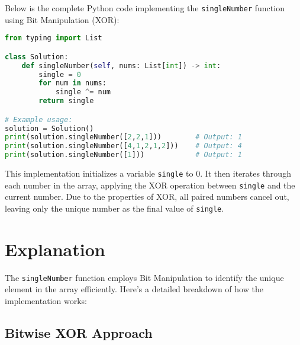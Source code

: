 
Below is the complete Python code implementing the \texttt{singleNumber} function using Bit Manipulation (XOR):

\begin{fullwidth}
\begin{lstlisting}[language=Python]
from typing import List

class Solution:
    def singleNumber(self, nums: List[int]) -> int:
        single = 0
        for num in nums:
            single ^= num
        return single

# Example usage:
solution = Solution()
print(solution.singleNumber([2,2,1]))        # Output: 1
print(solution.singleNumber([4,1,2,1,2]))    # Output: 4
print(solution.singleNumber([1]))            # Output: 1
\end{lstlisting}
\end{fullwidth}

This implementation initializes a variable \texttt{single} to 0. It then iterates through each number in the array, applying the XOR operation between \texttt{single} and the current number. Due to the properties of XOR, all paired numbers cancel out, leaving only the unique number as the final value of \texttt{single}.

\section*{Explanation}

The \texttt{singleNumber} function employs Bit Manipulation to identify the unique element in the array efficiently. Here's a detailed breakdown of how the implementation works:

\subsection*{Bitwise XOR Approach}

